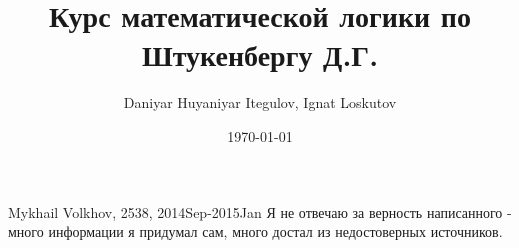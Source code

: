 \documentclass[12pt]{article}
\author{Daniyar Huyaniyar Itegulov, Ignat Loskutov}
\date{\today}
\title{Курс математической логики по Штукенбергу Д.Г.}
\newcommand{\+}{\lambda}
\begin{document}
\theoremstyle{definition}
\newtheorem*{definition}{Определение}[section]
\newtheorem*{example}{Пример}
\newtheorem{theorem}{Теорема}[section]
\newtheorem{axiom}{Аксиома}[section]
\newtheorem{lemma}[theorem]{Лемма}


\maketitle
\tableofcontents


Mykhail Volkhov, 2538, 2014Sep-2015Jan
Я не отвечаю за верность написанного - много информации
я придумал сам, много достал из недостоверных источников.








\end{document}
